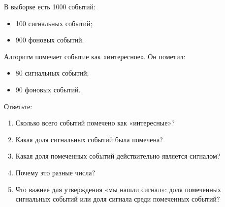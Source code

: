 \documentclass[
  russian,
  11pt,
  a4paper,
  open=any]{scrbook}
\providecommand{\tightlist}{%
  \setlength{\itemsep}{0pt}\setlength{\parskip}{0pt}}
\begin{document}
\begin{semanticpdfbox}[colback=BookCoralSoft,borderline west={1.2mm}{0pt}{BookCoral}]

\par\nopagebreak[4]\vspace{1.2mm}

В выборке есть 1000 событий:

\begin{itemize}
\tightlist
\item
  100 сигнальных событий;
\item
  900 фоновых событий.
\end{itemize}

Алгоритм помечает событие как «интересное». Он пометил:

\begin{itemize}
\tightlist
\item
  80 сигнальных событий;
\item
  90 фоновых событий.
\end{itemize}

Ответьте:

\begin{enumerate}
\def\labelenumi{\arabic{enumi}.}
\tightlist
\item
  Сколько всего событий помечено как «интересные»?
\item
  Какая доля сигнальных событий была помечена?
\item
  Какая доля помеченных событий действительно является сигналом?
\item
  Почему это разные числа?
\item
  Что важнее для утверждения «мы нашли сигнал»: доля помеченных
  сигнальных событий или доля сигнала среди помеченных событий?
\end{enumerate}

\end{semanticpdfbox}
\end{document}
